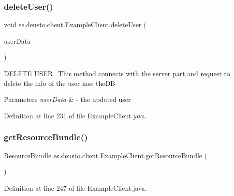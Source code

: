 \subsubsection{\texorpdfstring{delete\+User()}{deleteUser()}}
{\footnotesize\ttfamily void es.\+deusto.\+client.\+Example\+Client.\+delete\+User (\begin{DoxyParamCaption}\item[{\hyperlink{classes_1_1deusto_1_1serialization_1_1_user_data}{User\+Data}}]{user\+Data }\end{DoxyParamCaption})}

D\+E\+L\+E\+TE U\+S\+ER~\newline
This method connects with the server part and request to delete the info of the user inse the\+DB 
\begin{DoxyParams}{Parameters}
{\em user\+Data} & -\/ the updated user \\
\hline
\end{DoxyParams}


Definition at line 231 of file Example\+Client.\+java.

\mbox{\label{classes_1_1deusto_1_1client_1_1_example_client_a85a29c19dfbfcad9d08dcc17d688d8d3}} 
\subsubsection{\texorpdfstring{get\+Resource\+Bundle()}{getResourceBundle()}}
{\footnotesize\ttfamily Resource\+Bundle es.\+deusto.\+client.\+Example\+Client.\+get\+Resource\+Bundle (\begin{DoxyParamCaption}{ }\end{DoxyParamCaption})}



Definition at line 247 of file Example\+Client.\+java.

\mbox{\label{classes_1_1deusto_1_1client_1_1_example_client_a9eadbc017db92b83cad1f6b72c10bae2}} 
